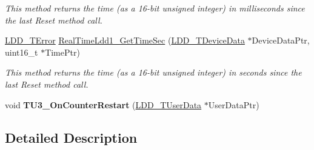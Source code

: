 \begin{DoxyCompactItemize}
\begin{DoxyCompactList}\small\item\em This method returns the time (as a 16-\/bit unsigned integer) in milliseconds since the last Reset method call. \end{DoxyCompactList}\item 
\hyperlink{group___p_e___types__module_ga24c2b045fd04e79e85f261ce4df35588}{L\-D\-D\-\_\-\-T\-Error} \hyperlink{group___real_time_ldd1__module_ga4ef5eebdd8e35716a31357eeadffe902}{Real\-Time\-Ldd1\-\_\-\-Get\-Time\-Sec} (\hyperlink{group___p_e___types__module_gac5cf1362f1f0e3a2ce71b1bf2276d091}{L\-D\-D\-\_\-\-T\-Device\-Data} $\ast$Device\-Data\-Ptr, uint16\-\_\-t $\ast$Time\-Ptr)
\begin{DoxyCompactList}\small\item\em This method returns the time (as a 16-\/bit unsigned integer) in seconds since the last Reset method call. \end{DoxyCompactList}\item 
\hypertarget{group___real_time_ldd1__module_ga34d8cdc40edc8f302ae2ff3bebb8a877}{void {\bfseries T\-U3\-\_\-\-On\-Counter\-Restart} (\hyperlink{group___p_e___types__module_ga0b66a73f87238a782318aa0be7578e35}{L\-D\-D\-\_\-\-T\-User\-Data} $\ast$User\-Data\-Ptr)}\label{group___real_time_ldd1__module_ga34d8cdc40edc8f302ae2ff3bebb8a877}

\end{DoxyCompactItemize}


\subsection{Detailed Description}


